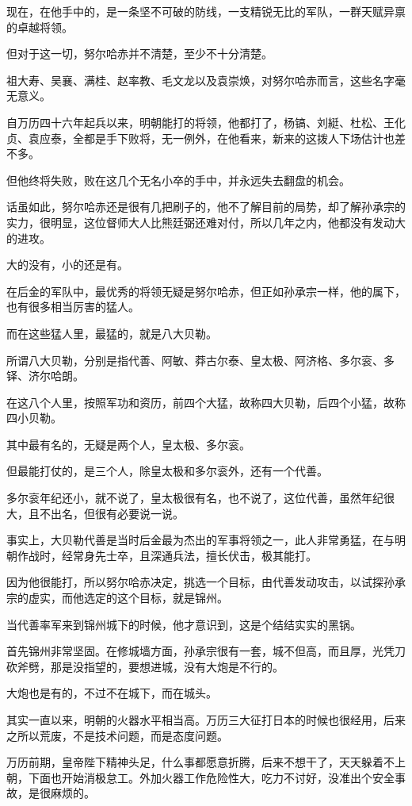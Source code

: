 \begin{multicols}{\theparacolNo}
现在，在他手中的，是一条坚不可破的防线，一支精锐无比的军队，一群天赋异禀的卓越将领。

但对于这一切，努尔哈赤并不清楚，至少不十分清楚。

祖大寿、吴襄、满桂、赵率教、毛文龙以及袁崇焕，对努尔哈赤而言，这些名字毫无意义。

自万历四十六年起兵以来，明朝能打的将领，他都打了，杨镐、刘綎、杜松、王化贞、袁应泰，全都是手下败将，无一例外，在他看来，新来的这拨人下场估计也差不多。

但他终将失败，败在这几个无名小卒的手中，并永远失去翻盘的机会。

话虽如此，努尔哈赤还是很有几把刷子的，他不了解目前的局势，却了解孙承宗的实力，很明显，这位督师大人比熊廷弼还难对付，所以几年之内，他都没有发动大的进攻。

大的没有，小的还是有。

在后金的军队中，最优秀的将领无疑是努尔哈赤，但正如孙承宗一样，他的属下，也有很多相当厉害的猛人。

而在这些猛人里，最猛的，就是八大贝勒。

所谓八大贝勒，分别是指代善、阿敏、莽古尔泰、皇太极、阿济格、多尔衮、多铎、济尔哈朗。

在这八个人里，按照军功和资历，前四个大猛，故称四大贝勒，后四个小猛，故称四小贝勒。

其中最有名的，无疑是两个人，皇太极、多尔衮。

但最能打仗的，是三个人，除皇太极和多尔衮外，还有一个代善。

多尔衮年纪还小，就不说了，皇太极很有名，也不说了，这位代善，虽然年纪很大，且不出名，但很有必要说一说。

事实上，大贝勒代善是当时后金最为杰出的军事将领之一，此人非常勇猛，在与明朝作战时，经常身先士卒，且深通兵法，擅长伏击，极其能打。

因为他很能打，所以努尔哈赤决定，挑选一个目标，由代善发动攻击，以试探孙承宗的虚实，而他选定的这个目标，就是锦州。

当代善率军来到锦州城下的时候，他才意识到，这是个结结实实的黑锅。

首先锦州非常坚固。在修城墙方面，孙承宗很有一套，城不但高，而且厚，光凭刀砍斧劈，那是没指望的，要想进城，没有大炮是不行的。

大炮也是有的，不过不在城下，而在城头。

其实一直以来，明朝的火器水平相当高。万历三大征打日本的时候也很经用，后来之所以荒废，不是技术问题，而是态度问题。

万历前期，皇帝陛下精神头足，什么事都愿意折腾，后来不想干了，天天躲着不上朝，下面也开始消极怠工。外加火器工作危险性大，吃力不讨好，没准出个安全事故，是很麻烦的。


\end{multicols}
